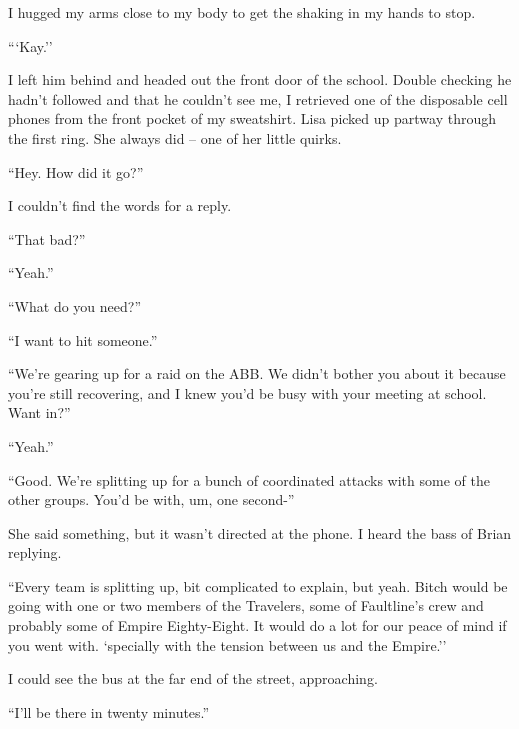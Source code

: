 I hugged my arms close to my body to get the shaking in my hands to stop.



```Kay.''



I left him behind and headed out the front door of the school.  Double checking he hadn't followed and that he couldn't see me, I retrieved one of the disposable cell phones from the front pocket of my sweatshirt.  Lisa picked up partway through the first ring.  She always did – one of her little quirks.



``Hey.  How did it go?''



I couldn't find the words for a reply.



``That bad?''



``Yeah.''



``What do you need?''



``I want to hit someone.''



``We're gearing up for a raid on the ABB.  We didn't bother you about it because you're still recovering, and I knew you'd be busy with your meeting at school.  Want in?''



``Yeah.''



``Good.  We're splitting up for a bunch of coordinated attacks with some of the other groups.  You'd be with, um, one second-''



She said something, but it wasn't directed at the phone.  I heard the bass of Brian replying.



``Every team is splitting up, bit complicated to explain, but yeah.  Bitch would be going with one or two members of the Travelers, some of Faultline's crew and probably some of Empire Eighty-Eight.  It would do a lot for our peace of mind if you went with.  `specially with the tension between us and the Empire.''



I could see the bus at the far end of the street, approaching.



``I'll be there in twenty minutes.''





